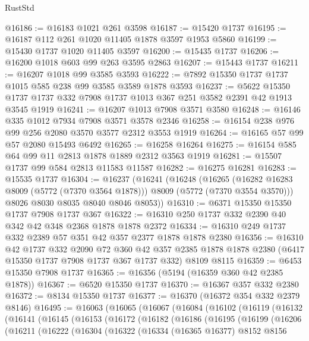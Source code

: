 \begin{lexlean}{RustStd}
\begin{coremodule}
@16186 := @16183 @1021 @261 @3598
@16187 := @15420 @1737
@16195 := @16187 @112 @261 @1020 @11405 @1878 @3597 @1953 @5860
@16199 := @15430 @1737 @1020 @11405 @3597
@16200 := @15435 @1737
@16206 := @16200 @1018 @603 @99 @263 @3595 @2863
@16207 := @15443 @1737
@16211 := @16207 @1018 @99 @3585 @3593
@16222 := @7892 @15350 @1737 @1737 @1015 @585 @238 @99 @3585 @3589 @1878 @3593
@16237 := @5622
    @15350
    @1737
    @1737
    @332
    @7908
    @1737
    @1013
    @367
    @251
    @3582
    @2391
    @42
    @1913
    @3545
    @1919
@16241 := @16207 @1013 @7908 @3571 @3580
@16248 := @16146 @335 @1012 @7934 @7908 @3571 @3578 @2346
@16258 := @16154 @238 @976 @99 @256 @2080 @3570 @3577 @2312 @3553 @1919
@16264 := @16165 @57 @99 @57 @2080 @15493 @6492
@16265 := @16258 @16264
@16275 := @16154 @585 @64 @99 @11 @2813 @1878 @1889 @2312 @3563 @1919
@16281 := @15507 @1737 @99 @584 @2813 @11583 @11587
@16282 := @16275 @16281
@16283 := @15535 @1737
@16304 := @16237
    (@16241
      (@16248
        (@16265 (@16282 @16283 @8009 (@5772 (@7370 @3564 @1878))) @8009 (@5772 (@7370 @3554 @3570)))
        @8026
        @8030
        @8035
        @8040
        @8046
        @8053))
@16310 := @6371 @15350 @15350 @1737 @7908 @1737 @367
@16322 := @16310 @250 @1737 @332 @2390 @40 @342 @42 @348 @2368 @1878 @1878 @2372
@16334 := @16310 @249 @1737 @332 @2389 @57 @351 @42 @357 @2377 @1878 @1878 @2380
@16356 := @16310
    @42
    @1737
    @332
    @2090
    @72
    @360
    @42
    @357
    @2385
    @1878
    @1878
    @2380
    (@6417 @15350 @1737 @7908 @1737 @367 @1737 @332)
    @8109
    @8115
@16359 := @6453 @15350 @7908 @1737
@16365 := @16356 (@5194 (@16359 @360 @42 @2385 @1878))
@16367 := @6520 @15350 @1737
@16370 := @16367 @357 @332 @2380
@16372 := @8134 @15350 @1737
@16377 := @16370 (@16372 @354 @332 @2379 @8146)
@16495 := @16063
    (@16065
      (@16067
        (@16084
          (@16102
            (@16119
              (@16132
                (@16141
                  (@16145
                    (@16153
                      (@16172
                        (@16182
                          (@16186
                            (@16195
                              (@16199
                                (@16206
                                  (@16211
                                    (@16222
                                      (@16304
                                        (@16322
                                          (@16334
                                            (@16365 @16377)
                                            @8152
                                            @8156

\end{coremodule}
\end{lexlean}
